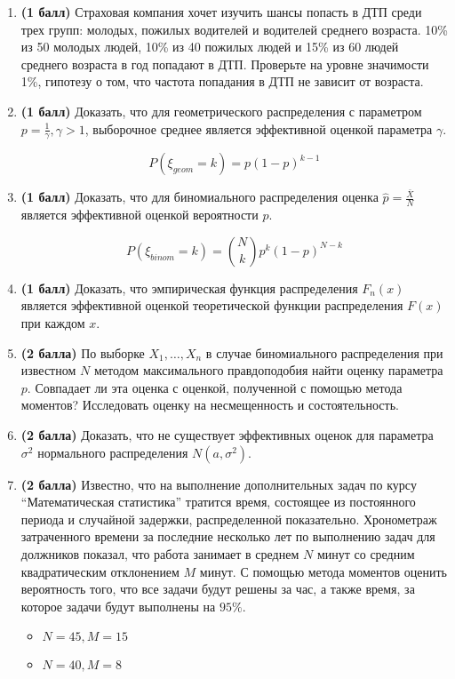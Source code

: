\documentclass{assignment}
\begin{document}
\begin{enumerate}
    \item \textbf{(1 балл)} Страховая компания хочет изучить шансы попасть в ДТП среди трех групп: молодых, пожилых водителей и водителей среднего возраста. 10\% из 50 молодых людей, 10\% из 40 пожилых людей и 15\% из 60 людей среднего возраста в год попадают в ДТП. Проверьте на уровне значимости 1\%, гипотезу о том, что частота попадания в ДТП не зависит от возраста.

    \item \textbf{(1 балл)} Доказать, что для геометрического распределения с параметром $\displaystyle p = \frac{1}{\gamma}, \gamma > 1$, выборочное среднее является эффективной оценкой параметра $\gamma$.

    $$P(\xi_{geom} = k) = p(1 - p)^{k - 1}$$
    
    \item \textbf{(1 балл)} Доказать, что для биномиального распределения оценка $\displaystyle \hat{p} = \frac{\bar{X}}{N}$ является эффективной оценкой вероятности $p$.

    $$P(\xi_{binom} = k) = \binom{N}{k} p^{k}(1 - p)^{N - k}$$

    \item \textbf{(1 балл)} Доказать, что эмпирическая функция распределения $F_n(x)$ является эффективной оценкой теоретической функции распределения $F(x)$ при каждом $x$.

    \item \textbf{(2 балла)} По выборке $X_1, \ldots, X_n$ в случае биномиального распределения при известном $N$ методом максимального правдоподобия найти оценку параметра $p$. Совпадает ли эта оценка с оценкой, полученной с помощью метода моментов? Исследовать оценку на несмещенность и состоятельность.

    \item \textbf{(2 балла)} Доказать, что не существует эффективных оценок для параметра $\sigma^2$ нормального распределения $N(a, \sigma^2)$.

    \item \textbf{(2 балла)} Известно, что на выполнение дополнительных задач по курсу ``Математическая статистика'' тратится время, состоящее из постоянного периода и случайной задержки, распределенной показательно. Хронометраж затраченного времени за последние несколько лет по выполнению задач для должников показал, что работа занимает в среднем $N$ минут со средним квадратическим отклонением $M$ минут. С помощью метода моментов оценить вероятность того, что все задачи будут решены за час, а также время, за которое задачи будут выполнены на $95\%$. 
    \begin{itemize}
        \item $N = 45, M = 15$
        \item $N = 40, M = 8$
    \end{itemize}



\end{enumerate}
\end{document}
